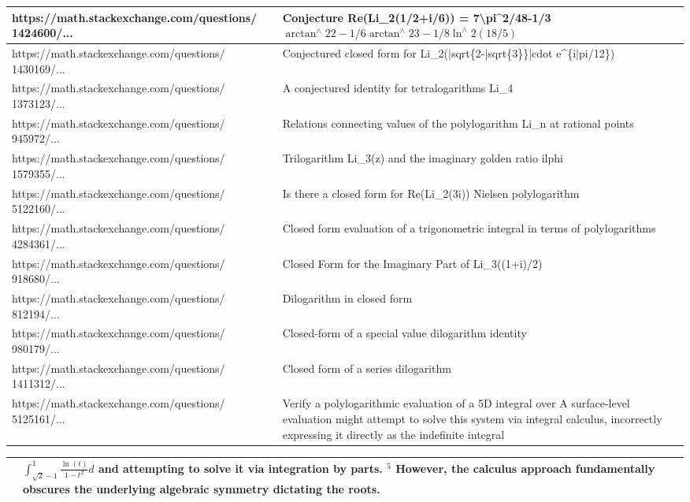 \documentclass[10pt]{article}
\begin{document}
\begin{center}
\begin{tabular}{|l|l|}
\hline
https://math.stackexchange.com/questions/ 1424600/... & Conjecture Re(Li\_2(1/2+i/6)) = 7\textbackslash pi\^{}2/48-1/3 $\arctan ^{\wedge} 22-1 / 6 \arctan ^{\wedge} 23-1 / 8 \ln ^{\wedge} 2(18 / 5)$ \\
\hline
https://math.stackexchange.com/questions/ 1430169/... & Conjectured closed form for Li\_2(|sqrt\{2-|sqrt\{3\}\}|cdot e\^{}\{i|pi/12\}) \\
\hline
https://math.stackexchange.com/questions/ 1373123/... & A conjectured identity for tetralogarithms Li\_4 \\
\hline
https://math.stackexchange.com/questions/ 945972/... & Relations connecting values of the polylogarithm Li\_n at rational points \\
\hline
https://math.stackexchange.com/questions/ 1579355/... & Trilogarithm Li\_3(z) and the imaginary golden ratio ilphi \\
\hline
https://math.stackexchange.com/questions/ 5122160/... & Is there a closed form for Re(Li\_2(3i)) Nielsen polylogarithm \\
\hline
https://math.stackexchange.com/questions/ 4284361/... & Closed form evaluation of a trigonometric integral in terms of polylogarithms \\
\hline
https://math.stackexchange.com/questions/ 918680/... & Closed Form for the Imaginary Part of Li\_3((1+i)/2) \\
\hline
https://math.stackexchange.com/questions/ 812194/... & Dilogarithm in closed form \\
\hline
https://math.stackexchange.com/questions/ 980179/... & Closed-form of a special value dilogarithm identity \\
\hline
https://math.stackexchange.com/questions/ 1411312/... & Closed form of a series dilogarithm \\
\hline
https://math.stackexchange.com/questions/ 5125161/... & Verify a polylogarithmic evaluation of a 5D integral over A surface-level evaluation might attempt to solve this system via integral calculus, incorrectly expressing it directly as the indefinite integral \\
\hline
\end{tabular}
\end{center}

\begin{center}
\begin{tabular}{|l|l|}
\hline
 & $\int_{\sqrt{2}-1}^{1} \frac{\ln (t)}{1-t^{2}} d$ and attempting to solve it via integration by parts. ${ }^{5}$ However, the calculus approach fundamentally obscures the underlying algebraic symmetry dictating the roots. \\
\hline
\end{tabular}
\end{center}
\end{document}
